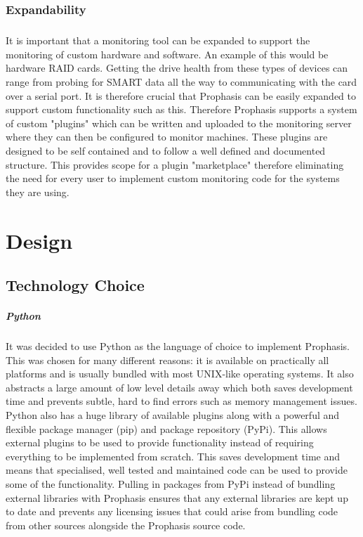 \documentclass[bsc,logo,twoside,singlespacing,notimes]{infthesis}
\begin{document}
\subsection{Expandability}
\paragraph*{}
	It is important that a monitoring tool can be expanded to support the
	monitoring of custom hardware and software.  An example of this would be
	hardware RAID cards.  Getting the drive health from these types of devices can
	range from probing for SMART data all the way to communicating with the card
	over a serial port.  It is therefore crucial that Prophasis can be easily
	expanded to support custom functionality such as this. Therefore Prophasis
	supports a system of custom "plugins" which can be written and uploaded to the
	monitoring server where they can then be configured to monitor machines. These
	plugins are designed to be self contained and to follow a well defined and
	documented structure.  This provides scope for a plugin "marketplace" therefore
	eliminating the need for every user to implement custom monitoring code for the
	systems they are using.


\chapter{Design}
\section{Technology Choice}
\paragraph*{Python}
	It was decided to use Python as the language of choice to implement Prophasis.
	This was chosen for many different reasons: it is available on practically all
	platforms and is usually bundled with most UNIX-like operating systems.  It
	also abstracts a large amount of low level details away which both saves
	development time and prevents subtle, hard to find errors such as memory
	management issues.  Python also has a huge library of available plugins along
	with a powerful and flexible package manager (pip) and package repository
	(PyPi).  This allows external plugins to be used to provide functionality
	instead of requiring everything to be implemented from scratch.  This saves
	development time and means that specialised, well tested and maintained code
	can be used to provide some of the functionality.  Pulling in packages from
	PyPi instead of bundling external libraries with Prophasis ensures that any
	external libraries are kept up to date and prevents any licensing issues that
	could arise from bundling code from other sources alongside the Prophasis
	source code.
	
\end{document}
